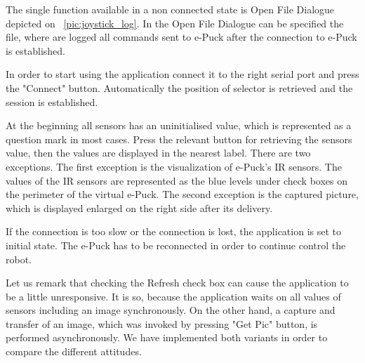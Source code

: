   The single function available in a non connected state
  is Open File Dialogue depicted on ~\ref{pic:joystick_log}.
  In the  Open File Dialogue can be specified the file, 
  where are logged all commands sent to e-Puck after the connection
  to e-Puck is established.

  In order to start using the application connect it to the right serial port and press the "Connect" button.
  Automatically the position of selector is retrieved and the session is established.

  At the beginning all sensors has an uninitialised value, which is represented as a question mark 
  in most cases.
  Press the relevant button for retrieving the sensors value, then the values are displayed in the nearest label.
  There are two exceptions. The first exception is the visualization of e-Puck's IR sensors. 
  The values of the IR sensors
  are represented as the blue levels under check boxes on 
  the perimeter of the virtual e-Puck.
  The second  exception is the captured picture, which is displayed enlarged on the right side after its delivery.

  If the connection is too slow or the connection is lost, the application
  is set to initial state. The e-Puck has to be reconnected in order to continue control the robot.

  Let us remark that checking the Refresh check box can cause the application to be a little unresponsive.	
  It is so, because the application waits on all values of sensors including an image synchronously.
  On the other hand, a capture and transfer of an image, which was invoked by pressing "Get Pic" button,
  is performed asynchronously. 
  We have implemented both variants in order to compare the different attitudes.

